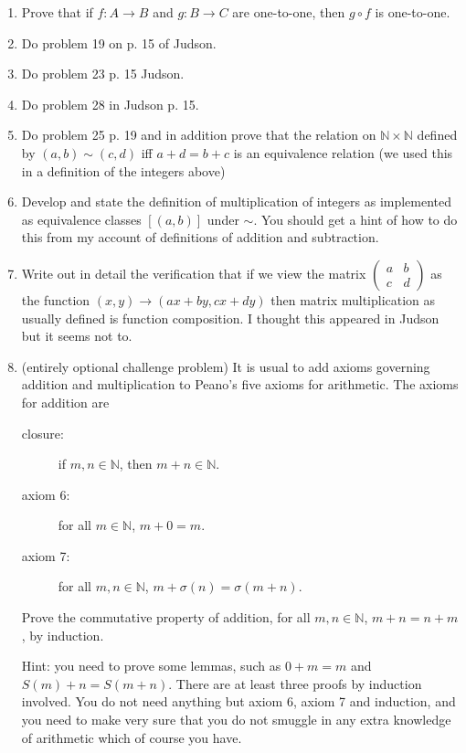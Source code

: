 \documentclass[12pt]{article}
\begin{document}
\begin{enumerate}

\item  Prove that if $f:A \rightarrow B$ and $g:B \rightarrow C$ are one-to-one, then $g \circ f$ is one-to-one.

\item   Do problem 19 on p. 15 of Judson.

\item  Do problem 23 p. 15 Judson.

\item  Do problem 28 in Judson p. 15.

\item Do problem 25 p. 19 and in addition prove that the relation on $\mathbb N \times \mathbb N$ defined by $(a,b) \sim (c,d)$ iff $a+d = b+c$ is an equivalence relation (we used this in a definition of the integers above)

\item  Develop and state the definition of multiplication of integers as implemented as equivalence classes $[(a,b)]$ under $\sim$.  You should get a hint of how to do this from my account of definitions of addition and subtraction.

\item Write out in detail the verification that if we view the matrix $\left(\begin{array}{cc} a & b \\ c & d \end{array}\right)$ as the function $(x,y) \rightarrow (ax+by,cx+dy)$ then matrix multiplication as usually defined is function composition.  I thought this appeared in Judson but it seems not to.


\item (entirely optional challenge problem)  It is usual to add axioms governing addition and multiplication to Peano's five axioms for arithmetic.  The axioms for addition are

\begin{description}

\item[closure:]  if $m,n \in \mathbb N$, then $m+n \in \mathbb N$.

\item[axiom 6:] for all $m \in \mathbb N$, $m+0=m$.

\item[axiom 7:]  for all $m,n \in \mathbb N$, $m+\sigma(n) = \sigma(m+n)$.

\end{description}

Prove the commutative property of addition, for all $m,n \in \mathbb N$, $m+n = n+m$, by induction.

Hint:  you need to prove some lemmas, such as $0+m = m$ and $S(m)+n = S(m+n)$.  There are at least three proofs by induction involved.  You do not need anything but axiom 6, axiom 7 and induction, and you need to make very sure that you do not smuggle in any extra knowledge of arithmetic which of course you have.

\end{enumerate}
\end{document}
